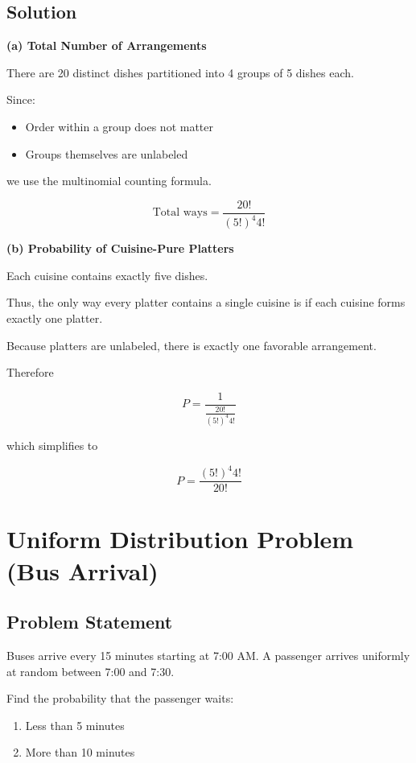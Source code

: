 \documentclass[12pt]{article}
\begin{document}
\subsection*{Solution}

\textbf{(a) Total Number of Arrangements}

There are 20 distinct dishes partitioned into 4 groups of 5 dishes each.

Since:

\begin{itemize}
\item Order within a group does not matter
\item Groups themselves are unlabeled
\end{itemize}

we use the multinomial counting formula.

\[
\text{Total ways} = \frac{20!}{(5!)^4 4!}
\]

\textbf{(b) Probability of Cuisine-Pure Platters}

Each cuisine contains exactly five dishes.

Thus, the only way every platter contains a single cuisine is if each cuisine forms exactly one platter.

Because platters are unlabeled, there is exactly one favorable arrangement.

Therefore

\[
P = \frac{1}{\frac{20!}{(5!)^4 4!}}
\]

which simplifies to

\[
P = \frac{(5!)^4 4!}{20!}
\]

\section{Uniform Distribution Problem (Bus Arrival)}

\subsection*{Problem Statement}

Buses arrive every 15 minutes starting at 7:00 AM. A passenger arrives uniformly at random between 7:00 and 7:30.

Find the probability that the passenger waits:

\begin{enumerate}
\item Less than 5 minutes
\item More than 10 minutes
\end{enumerate}
\end{document}
